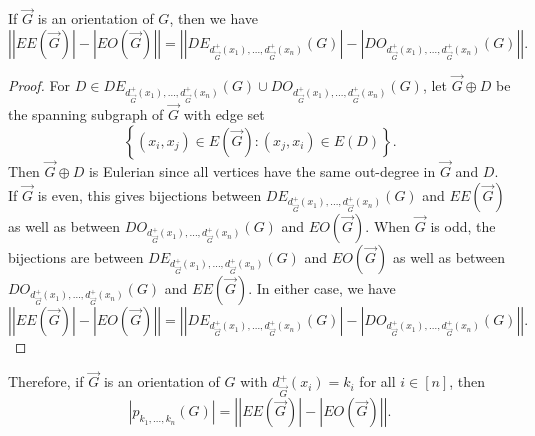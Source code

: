 \documentclass{amsbook}
\theoremstyle{plain}
\numberwithin{equation}{chapter}
\newcommand{\setb}[3]{\left\{ #1 \in #2 : #3 \right\}}
\newcommand{\card}[1]{\left|#1\right|}
\newcommand{\irange}[1]{\left[#1\right]}
\begin{document}
\begin{EulerianOrientationsLemma}
If $\vec{G}$ is an orientation of $G$, then we have
\[\card{|EE(\vec{G})| - |EO(\vec{G})|} = \card{|DE_{d_{\vec{G}}^+(x_1), \ldots, d_{\vec{G}}^+(x_n)}(G)|- |DO_{d_{\vec{G}}^+(x_1), \ldots, d_{\vec{G}}^+(x_n)}(G)|}.\]
\end{EulerianOrientationsLemma}
\begin{proof}
	For $D \in DE_{d_{\vec{G}}^+(x_1), \ldots, d_{\vec{G}}^+(x_n)}(G) \cup DO_{d_{\vec{G}}^+(x_1), \ldots, d_{\vec{G}}^+(x_n)}(G)$, let $\vec{G} \oplus D$ be the spanning subgraph of $\vec{G}$ with edge set 
	\[\setb{(x_i,x_j)}{E(\vec{G})}{(x_j,x_i) \in E(D)}.\]
	Then $\vec{G} \oplus D$ is Eulerian since all vertices have the same out-degree in $\vec{G}$ and $D$.  If $\vec{G}$ is even, this gives bijections between $DE_{d_{\vec{G}}^+(x_1), \ldots, d_{\vec{G}}^+(x_n)}(G)$ and $EE(\vec{G})$ as well as between $DO_{d_{\vec{G}}^+(x_1), \ldots, d_{\vec{G}}^+(x_n)}(G)$ and $EO(\vec{G})$.  When $\vec{G}$ is odd, the bijections are between $DE_{d_{\vec{G}}^+(x_1), \ldots, d_{\vec{G}}^+(x_n)}(G)$ and $EO(\vec{G})$ as well as between $DO_{d_{\vec{G}}^+(x_1), \ldots, d_{\vec{G}}^+(x_n)}(G)$ and $EE(\vec{G})$.  In either case, we have
\[\card{|EE(\vec{G})| - |EO(\vec{G})|} = \card{|DE_{d_{\vec{G}}^+(x_1), \ldots, d_{\vec{G}}^+(x_n)}(G)|- |DO_{d_{\vec{G}}^+(x_1), \ldots, d_{\vec{G}}^+(x_n)}(G)|}.\]
\end{proof} 
Therefore, if $\vec{G}$ is an orientation of $G$ with $d_{\vec{G}}^+(x_i) = k_i$ for all $i \in \irange{n}$, then
\[|p_{k_1, \ldots, k_n}(G)| = \card{|EE(\vec{G})| - |EO(\vec{G})|}.\]
\end{document}

